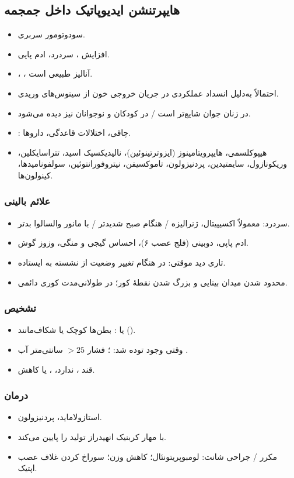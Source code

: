 \subsection{هایپرتنشن ایدیوپاتیک داخل جمجمه}
\begin{itemize}
\item سودوتومور سربری.
\item افزایش ، سردرد، ادم پاپی.
\item {}، ، آنالیز  طبیعی است.
\item احتمالاً به‌دلیل انسداد عملکردی در جریان خروجی خون از سینوس‌های وریدی.
\item در زنان جوان شایع‌تر است / در کودکان و نوجوانان نیز دیده می‌شود.
\item {}: چاقی، اختلالات قاعدگی، داروها.
\item هیپوکلسمی، هایپرویتامینوز  (ایزوترتینوئین)، نالیدیکسیک اسید، تتراسایکلین، وریکونازول، سایمتیدین، پردنیزولون، تاموکسیفن، نیتروفورانتوئین، سولفونامیدها، کینولون‌ها.
\end{itemize}
\subsubsection{علائم بالینی}
\begin{itemize}
\item سردرد: معمولاً اکسیپیتال، ژنرالیزه / هنگام صبح شدیدتر / با مانور والسالوا بدتر.
\item ادم پاپی، دوبینی (فلج عصب ۶)، احساس گیجی و منگی، وزوز گوش.
\item تاری دید موقتی: در هنگام تغییر وضعیت از نشسته به ایستاده.
\item محدود شدن میدان بینایی و بزرگ شدن نقطهٔ کور؛ در طولانی‌مدت کوری دائمی.
\end{itemize}
\subsubsection{تشخیص}
\begin{itemize}
\item {} یا : بطن‌ها کوچک یا شکاف‌مانند ().
\item وقتی وجود توده  شد: ؛ فشار  $>25$ سانتی‌متر آب .
\item قند ،  ندارد، ،  یا کاهش.
\end{itemize}
\subsubsection{درمان}
\begin{itemize}
\item استازولاماید، پردنیزولون.
\item با مهار کربنیک انهیدراز تولید  را پایین می‌کند.
\item {} مکرر / جراحی شانت: لومبوپریتونئال؛ کاهش وزن؛ سوراخ کردن غلاف عصب اپتیک.
\end{itemize}
